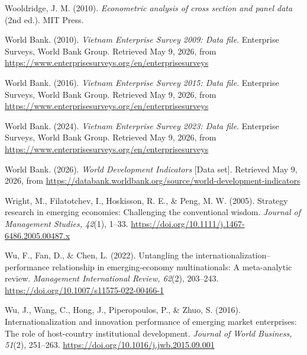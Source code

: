 \documentclass[12pt,a4paper]{article}
\begin{document}
Wooldridge, J. M. (2010). \emph{Econometric analysis of cross section
and panel data} (2nd ed.). MIT Press.

World Bank. (2010). \emph{Vietnam Enterprise Survey 2009: Data file}.
Enterprise Surveys, World Bank Group. Retrieved May 9, 2026, from
\url{https://www.enterprisesurveys.org/en/enterprisesurveys}

World Bank. (2016). \emph{Vietnam Enterprise Survey 2015: Data file}.
Enterprise Surveys, World Bank Group. Retrieved May 9, 2026, from
\url{https://www.enterprisesurveys.org/en/enterprisesurveys}

World Bank. (2024). \emph{Vietnam Enterprise Survey 2023: Data file}.
Enterprise Surveys, World Bank Group. Retrieved May 9, 2026, from
\url{https://www.enterprisesurveys.org/en/enterprisesurveys}

World Bank. (2026). \emph{World Development Indicators} {[}Data set{]}.
Retrieved May 9, 2026, from
\url{https://databank.worldbank.org/source/world-development-indicators}

Wright, M., Filatotchev, I., Hoskisson, R. E., \& Peng, M. W. (2005).
Strategy research in emerging economies: Challenging the conventional
wisdom. \emph{Journal of Management Studies, 42}(1), 1--33.
\url{https://doi.org/10.1111/j.1467-6486.2005.00487.x}

Wu, F., Fan, D., \& Chen, L. (2022). Untangling the
internationalization--performance relationship in emerging-economy
multinationals: A meta-analytic review. \emph{Management International
Review, 62}(2), 203--243.
\url{https://doi.org/10.1007/s11575-022-00466-1}

Wu, J., Wang, C., Hong, J., Piperopoulos, P., \& Zhuo, S. (2016).
Internationalization and innovation performance of emerging market
enterprises: The role of host-country institutional development.
\emph{Journal of World Business, 51}(2), 251--263.
\url{https://doi.org/10.1016/j.jwb.2015.09.001}
\end{document}
